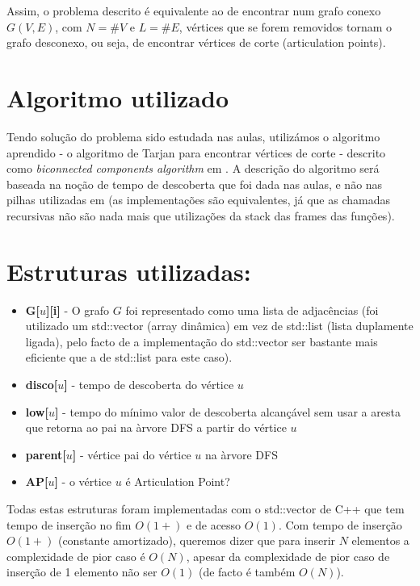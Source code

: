 \documentclass{scrartcl}
\begin{document}
Assim, o problema descrito é equivalente ao de encontrar num grafo conexo $G(V,E)$, com $N = \#V$ e $L = \#E$, vértices que se forem removidos tornam o grafo desconexo, ou seja, de encontrar vértices de corte (articulation points).


\section*{Algoritmo utilizado}
Tendo solução do problema sido estudada nas aulas, utilizámos o algoritmo aprendido - o algoritmo de Tarjan para encontrar vértices de corte - descrito como \textit{biconnected components algorithm} em \cite{Hopcroft:EAGM}. A descrição do algoritmo será baseada na noção de tempo de descoberta que foi dada nas aulas, e não nas pilhas utilizadas em \cite{Hopcroft:EAGM} (as implementações são equivalentes, já que as chamadas recursivas não são nada mais que utilizações da stack das frames das funções).

\section*{Estruturas utilizadas:}
\begin{itemize}
\setlength\itemsep{-0.5ex}
\item \textbf{G[$u$][i]} - O grafo $G$ foi representado como uma lista de adjacências (foi utilizado um std::vector (array dinâmica) em vez de std::list (lista duplamente ligada), pelo facto de a implementação do std::vector ser bastante mais eficiente que a de std::list para este caso). 

\item \textbf{disco[$u$]} - tempo de descoberta do vértice $u$
\item \textbf{low[$u$]} - tempo do mínimo valor de descoberta alcançável sem usar a aresta que retorna ao pai na àrvore DFS a partir do vértice $u$
\item \textbf{parent[$u$]} - vértice pai do vértice $u$ na àrvore DFS
\item \textbf{AP[$u$]} - o vértice $u$ é Articulation Point?
\end{itemize}
Todas estas estruturas foram implementadas com o std::vector de C++ que tem tempo de inserção no fim $O(1+)$ e de acesso $O(1)$. Com tempo de inserção $O(1+)$ (constante amortizado), queremos dizer que para inserir $N$ elementos a complexidade de pior caso é $O(N)$, apesar da complexidade de pior caso de inserção de 1 elemento não ser $O(1)$ (de facto é também $O(N)$). \cite{ISOC++:2003}
\end{document}
